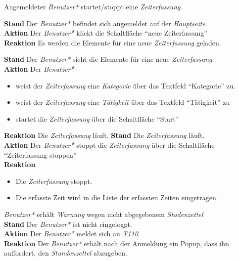 \begin{requirements}
\begin{requirements}
	\end{requirements}
	 Angemeldeter \emph{Benutzer*} startet/stoppt eine \emph{Zeiterfassung}.
	\begin{requirements}
            \textbf{Stand} Der \emph{Benutzer*} befindet sich angemeldet auf der \emph{Hauptseite}. \\
            \textbf{Aktion} Der \emph{Benutzer*} klickt die Schaltfläche "`neue Zeiterfassung"' \\
            \textbf{Reaktion} Es werden die Elemente für eine neue \emph{Zeiterfassung} geladen.
            \item
                \textbf{Stand} Der \emph{Benutzer*} sieht die Elemente für eine neue \emph{Zeiterfassung}. \\
                \textbf{Aktion} Der \emph{Benutzer*}
                    \begin{itemize}
                        \item weist der \emph{Zeiterfassung} eine \emph{Kategorie} über das Textfeld "`Kategorie"' zu.
                        \item weist der \emph{Zeiterfassung} eine \emph{Tätigkeit} über das Textfeld "`Tätigkeit"' zu
                        \item startet die \emph{Zeiterfassung} über die Schaltfläche "`Start"'
                    \end{itemize}
                \textbf{Reaktion} Die \emph{Zeiterfassung} läuft.
            \textbf{Stand} Die \emph{Zeiterfassung} läuft. \\
            \textbf{Aktion} Der \emph{Benutzer*} stoppt die \emph{Zeiterfassung} über die Schaltfläche "`Zeiterfassung stoppen"' \\
            \textbf{Reaktion}
                \begin{itemize}
                    \item Die \emph{Zeiterfassung} stoppt.
                    \item Die erfasste Zeit wird in die Liste der erfassten Zeiten eingetragen.
                \end{itemize}
	\end{requirements}


	 \emph{Benutzer*} erhält \emph{Warnung} wegen nicht abgegebenem \emph{Studenzettel} \\
        \textbf{Stand} Der \emph{Benutzer*} ist nicht eingeloggt. \\
        \textbf{Aktion} Der \emph{Benutzer*} meldet sich an \emph{T110}. \\
        \textbf{Reaktion} Der \emph{Benutzer*} erhält nach der Anmeldung ein Popup, dass ihn auffordert, den \emph{Stundenzettel} abzugeben.


\end{requirements}
